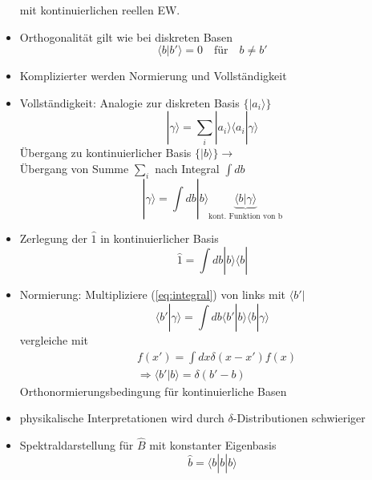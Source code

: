 \documentclass[10pt,article,colorback,accentcolor=tud9d]{scrartcl}
\begin{document}
\begin{fleqn}
\begin{itemize}
\begin{equation}
    \end{equation}
    mit kontinuierlichen reellen EW.
  \item Orthogonalität gilt wie bei diskreten Basen
    \begin{equation}
      \langle b\left.\right|b'\rangle=0 \quad \text{für} \quad b\neq b'
    \end{equation}
  \item Komplizierter werden Normierung und Vollständigkeit
  \item Vollständigkeit: Analogie zur diskreten Basis $\{\left.\right|a_i\rangle\}$
    \begin{equation}
      \left.\right|\gamma\rangle =\sum_i\left.\right|a_i\rangle \langle a_i\left.\right|\gamma\rangle
    \end{equation}
    Übergang zu kontinuierlicher Basis $\{\left.\right|b\rangle\} \rightarrow$\\
    Übergang von Summe $\sum_i$ nach Integral $\int db$
    \begin{equation}
    \left.\right|\gamma\rangle = \int db \left.\right|b\rangle \underbrace{\langle b\left.\right|\gamma\rangle}_{\text{kont. Funktion von b}}
    \label{eq:integral}
    \end{equation}
  \item Zerlegung der $\hat{1}$ in kontinuierlicher Basis
    \begin{equation}
      \hat{1} = \int db \left.\right|b\rangle\langle b\left.\right|
    \end{equation}
  \item Normierung: Multipliziere (\ref{eq:integral}) von links mit $\langle b'\left.\right|$
    \begin{equation}
      \langle b'\left.\right|\gamma\rangle =\int db \langle b'\left.\right|b\rangle\langle b \left.\right|\gamma\rangle
    \end{equation}
    vergleiche mit
    \begin{equation}
    \begin{aligned}
    &f(x') =\int dx \delta(x-x')f(x)\\
    &\Rightarrow \langle b'\left.\right|b\rangle = \delta(b'-b)
    \end{aligned}
    \end{equation}
    Orthonormierungsbedingung für kontinuierliche Basen
  \item physikalische Interpretationen wird durch $\delta$-Distributionen schwieriger
  \item Spektraldarstellung für $\hat{B}$ mit konstanter Eigenbasis
    \begin{equation}
    \hat{b}=\langle b\left.\right|b\left.\right|b\rangle %
    \end{equation}
\end{itemize}



\end{fleqn}
\end{document}
